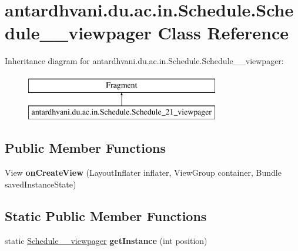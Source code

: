 \hypertarget{classantardhvani_1_1du_1_1ac_1_1in_1_1_schedule_1_1_schedule__21__viewpager}{}\section{antardhvani.\+du.\+ac.\+in.\+Schedule.\+Schedule\+\_\+\_\+viewpager Class Reference}
\label{classantardhvani_1_1du_1_1ac_1_1in_1_1_schedule_1_1_schedule__21__viewpager}
Inheritance diagram for antardhvani.\+du.\+ac.\+in.\+Schedule.\+Schedule\+\_\+\_\+viewpager\+:\begin{figure}[H]
\begin{center}
\leavevmode
\includegraphics[height=2.000000cm]{classantardhvani_1_1du_1_1ac_1_1in_1_1_schedule_1_1_schedule__21__viewpager}
\end{center}
\end{figure}
\subsection*{Public Member Functions}
\begin{DoxyCompactItemize}
\item 
\hypertarget{classantardhvani_1_1du_1_1ac_1_1in_1_1_schedule_1_1_schedule__21__viewpager_aadc83ff0c6a77ba6920842664e84504a}{}View {\bfseries on\+Create\+View} (Layout\+Inflater inflater, View\+Group container, Bundle saved\+Instance\+State)\label{classantardhvani_1_1du_1_1ac_1_1in_1_1_schedule_1_1_schedule__21__viewpager_aadc83ff0c6a77ba6920842664e84504a}

\end{DoxyCompactItemize}
\subsection*{Static Public Member Functions}
\begin{DoxyCompactItemize}
\item 
\hypertarget{classantardhvani_1_1du_1_1ac_1_1in_1_1_schedule_1_1_schedule__21__viewpager_a38775f50e93e16067139fe28b4569dc1}{}static \hyperlink{classantardhvani_1_1du_1_1ac_1_1in_1_1_schedule_1_1_schedule__21__viewpager}{Schedule\+\_\+\_\+viewpager} {\bfseries get\+Instance} (int position)\label{classantardhvani_1_1du_1_1ac_1_1in_1_1_schedule_1_1_schedule__21__viewpager_a38775f50e93e16067139fe28b4569dc1}

\end{DoxyCompactItemize}
